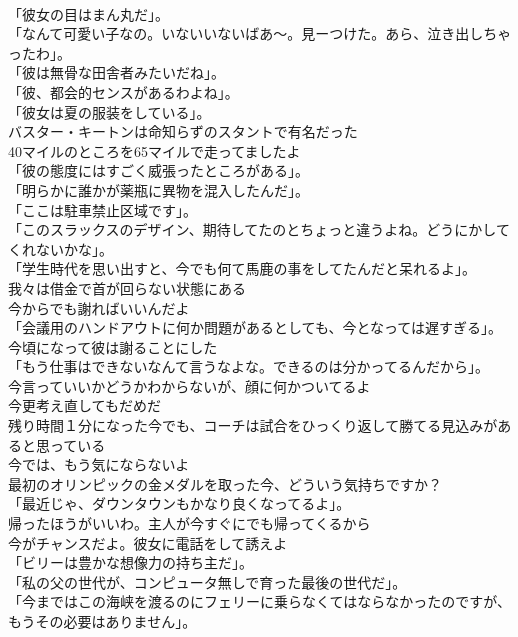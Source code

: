 \documentclass[8pt]{extreport}
\begin{document}
\begin{CJK}{UTF8}{min}
\\	「彼女の目はまん丸だ」。	
\\	「なんて可愛い子なの。いないいないばあ～。見ーつけた。あら、泣き出しちゃったわ」。	
\\	「彼は無骨な田舎者みたいだね」。	
\\	「彼、都会的センスがあるわよね」。	
\\	「彼女は夏の服装をしている」。	
\\	バスター・キートンは命知らずのスタントで有名だった	
\\	40マイルのところを65マイルで走ってましたよ	
\\	「彼の態度にはすごく威張ったところがある」。	
\\	「明らかに誰かが薬瓶に異物を混入したんだ」。	
\\	「ここは駐車禁止区域です」。	
\\	「このスラックスのデザイン、期待してたのとちょっと違うよね。どうにかしてくれないかな」。	
\\	「学生時代を思い出すと、今でも何て馬鹿の事をしてたんだと呆れるよ」。	
\\	我々は借金で首が回らない状態にある	
\\	今からでも謝ればいいんだよ	
\\	「会議用のハンドアウトに何か問題があるとしても、今となっては遅すぎる」。	
\\	今頃になって彼は謝ることにした	
\\	「もう仕事はできないなんて言うなよな。できるのは分かってるんだから」。	
\\	今言っていいかどうかわからないが、顔に何かついてるよ	
\\	今更考え直してもだめだ	
\\	残り時間１分になった今でも、コーチは試合をひっくり返して勝てる見込みがあると思っている	
\\	今では、もう気にならないよ	
\\	最初のオリンピックの金メダルを取った今、どういう気持ちですか？	
\\	「最近じゃ、ダウンタウンもかなり良くなってるよ」。	
\\	帰ったほうがいいわ。主人が今すぐにでも帰ってくるから	
\\	今がチャンスだよ。彼女に電話をして誘えよ	
\\	「ビリーは豊かな想像力の持ち主だ」。	
\\	「私の父の世代が、コンピュータ無しで育った最後の世代だ」。	
\\	「今まではこの海峡を渡るのにフェリーに乗らなくてはならなかったのですが、もうその必要はありません」。	

\end{CJK}
\end{document}
